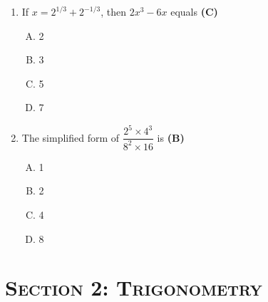 \documentclass[10pt,a4paper]{article}
\newcommand{\topic}[1]{\section*{\large\textsc{#1}}}
\begin{document}
\begin{enumerate}[1.]
\item If $x = 2^{1/3} + 2^{-1/3}$, then $2x^3 - 6x$ equals \hfill \textbf{(C)}
\begin{enumerate}[(A)]
    \item 2
    \item 3
    \item 5
    \item 7
\end{enumerate}

\item The simplified form of $\dfrac{2^5 \times 4^3}{8^2 \times 16}$ is \hfill \textbf{(B)}
\begin{enumerate}[(A)]
    \item 1
    \item 2
    \item 4
    \item 8
\end{enumerate}

\end{enumerate}

\newpage
\topic{Section 2: Trigonometry}
\end{document}
